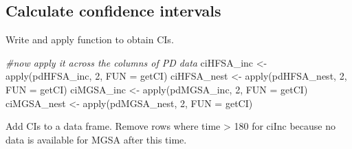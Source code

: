 \documentclass[
]{article}
\newenvironment{Shaded}{\begin{snugshade}}{\end{snugshade}}
\newcommand{\AttributeTok}[1]{\textcolor[rgb]{0.77,0.63,0.00}{#1}}
\newcommand{\CommentTok}[1]{\textcolor[rgb]{0.56,0.35,0.01}{\textit{#1}}}
\newcommand{\DecValTok}[1]{\textcolor[rgb]{0.00,0.00,0.81}{#1}}
\newcommand{\FunctionTok}[1]{\textcolor[rgb]{0.00,0.00,0.00}{#1}}
\newcommand{\NormalTok}[1]{#1}
\newcommand{\OtherTok}[1]{\textcolor[rgb]{0.56,0.35,0.01}{#1}}
\begin{document}
\hypertarget{calculate-confidence-intervals-1}{%
\subsection{Calculate confidence
intervals}\label{calculate-confidence-intervals-1}}

Write and apply function to obtain CIs.

\begin{Shaded}
\begin{Highlighting}[]
\CommentTok{\#now apply it across the columns of PD data}
\NormalTok{ciHFSA\_inc }\OtherTok{\textless{}{-}} \FunctionTok{apply}\NormalTok{(pdHFSA\_inc, }\DecValTok{2}\NormalTok{, }\AttributeTok{FUN =}\NormalTok{ getCI)}
\NormalTok{ciHFSA\_nest }\OtherTok{\textless{}{-}} \FunctionTok{apply}\NormalTok{(pdHFSA\_nest, }\DecValTok{2}\NormalTok{, }\AttributeTok{FUN =}\NormalTok{ getCI)}
\NormalTok{ciMGSA\_inc }\OtherTok{\textless{}{-}} \FunctionTok{apply}\NormalTok{(pdMGSA\_inc, }\DecValTok{2}\NormalTok{, }\AttributeTok{FUN =}\NormalTok{ getCI)}
\NormalTok{ciMGSA\_nest }\OtherTok{\textless{}{-}} \FunctionTok{apply}\NormalTok{(pdMGSA\_nest, }\DecValTok{2}\NormalTok{, }\AttributeTok{FUN =}\NormalTok{ getCI)}
\end{Highlighting}
\end{Shaded}

Add CIs to a data frame. Remove rows where time \textgreater{} 180 for
ciInc because no data is available for MGSA after this time.
\end{document}
